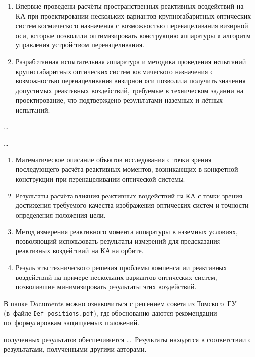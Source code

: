 {\novelty}
\begin{enumerate}[beginpenalty=10000] %
  \item Впервые проведены расчёты пространственных реактивных воздействий на КА при проектировании нескольких вариантов крупногабаритных оптических систем космического назначения с возможностью перенацеливания визирной оси, которые позволили оптимизировать конструкцию аппаратуры и алгоритм управления устройством перенацеливания.
  \item Разработанная испытательная аппаратура и методика проведения испытаний крупногабаритных оптических систем космического назначения с возможностью перенацеливания визирной оси позволила получить значения допустимых реактивных воздействий, требуемые в техническом задании на проектирование, что подтверждено результатами наземных и лётных испытаний. 
\end{enumerate}

{\influence} \ldots

{\methods} \ldots

{}
\begin{enumerate}[beginpenalty=10000] %
  \item Математическое описание объектов исследования с точки зрения последующего расчёта реактивных моментов, возникающих в конкретной конструкции при перенацеливании оптической системы.
  \item Результаты расчёта влияния реактивных воздействий на КА с точки зрения достижения требуемого качества изображения оптических систем и точности определения положения цели.
  \item Метод измерения реактивного момента аппаратуры в наземных условиях, позволяющий использовать результаты измерений для предсказания реактивных воздействий на КА на орбите.
  \item Результаты технического решения проблемы компенсации реактивных воздействий на примере нескольких вариантов оптических систем, позволившие минимизировать результаты этих воздействий.
\end{enumerate}
В папке Documents можно ознакомиться с решением совета из Томского~ГУ
(в~файле \verb+Def_positions.pdf+), где обоснованно даются рекомендации
по~формулировкам защищаемых положений.

{\reliability} полученных результатов обеспечивается \ldots \ Результаты находятся в соответствии с результатами, полученными другими авторами.


